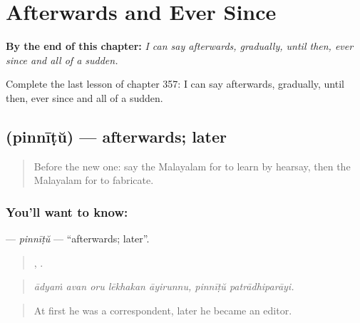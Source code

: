 
\chapter{Afterwards and Ever Since}
\label{ch:ml-afterwards-and-ever-since}

\begin{chapteropening}
\textbf{By the end of this chapter:} \emph{I can say afterwards, gradually, until then, ever since and all of a sudden.}

Complete the last lesson of chapter 357: I can say afterwards, gradually, until then, ever since and all of a sudden.
\end{chapteropening}

\section[\texorpdfstring{\ml{പിന്നീട്} (pinnīṭŭ)}{പിന്നീട് (pinnīṭŭ)}]{ (pinnīṭŭ) — afterwards; later}

\label{lesson:ML-C357-pinnitu}



\begin{quote}
Before the new one: say the Malayalam for to learn by hearsay, then the Malayalam for to fabricate.
\end{quote}

\subsection*{You'll want to know: }
\textbf{} — \emph{pinnīṭŭ} — \textquotedblleft{}afterwards; later\textquotedblright{}.

\begin{quote}
    ,  .
\end{quote}

\begin{quote}
\emph{ādyaṁ avan oru lēkhakan āyirunnu, pinnīṭŭ patrādhiparāyi.}
\end{quote}

\begin{quote}
At first he was a correspondent, later he became an editor.
\end{quote}

